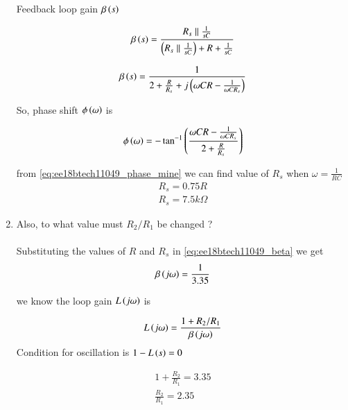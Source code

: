 \begin{enumerate}[label=\arabic*.,ref=\theenumi]
Feedback loop gain $\beta\left(s\right)$

\begin{align}
\label{eq:ee18btech11049_beta}
    \beta\brak{s} = \frac{R_s \parallel \frac{1}{sC}}{\brak{R_s \parallel \frac{1}{sC}} + R + \frac{1}{sC}}
\end{align}

\begin{align}
\label{eq:ee18btech11049_freq}
    \beta\brak{s} = \frac{1}{2 + \frac{R}{R_s} + j\brak{\omega CR - \frac{1}{\omega CR_s}}}
\end{align}

So, phase shift $\phi\left(\omega\right)$ is

\begin{align}
\label{eq:ee18btech11049_phase_mine}
    \phi\brak{\omega}  = -\tan^{-1}\brak{\frac{\omega CR - \frac{1}{\omega CR_s}}{2+\frac{R}{R_s}}}
\end{align}

from \ref{eq:ee18btech11049_phase_mine} we can find value of $R_s$ when $\omega = \frac{1}{RC}$ 
\begin{align}
   R_s = 0.75R \\
   R_s = 7.5k\Omega 
\end{align}


\item Also, to what value must $R_2/R_1$ be changed ?
\\
\\
\solution Substituting the values of $R $ and $ R_s$ in \ref{eq:ee18btech11049_beta} we get
\begin{align}
    \beta\left(j\omega\right) = \frac{1}{3.35}
\end{align}
%

we know the loop gain $L\left(j\omega\right)$ is


\begin{align}
    L\left(j\omega\right) = \frac{1+R_2/R_1}{\beta \left(j\omega\right)}
\end{align}
Condition for oscillation is $1-L\left(s\right) = 0$

\begin{align}
    1 + \frac{R_2}{R_1} = 3.35 \\
    \frac{R_2}{R_1} = 2.35
\end{align}
\end{enumerate}
